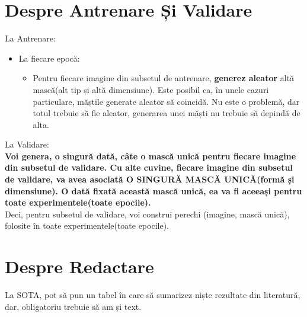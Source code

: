 \documentclass[12pt, a4paper]{article}
\begin{document}
\section{Despre Antrenare Și  Validare}
La Antrenare:
\begin{itemize}
    \item La fiecare epocă:
    \begin{itemize}
        \item Pentru fiecare imagine din subsetul de antrenare, \textbf{generez aleator} altă mască(alt tip și altă dimensiune). Este posibil ca, în unele cazuri particulare, măștile generate aleator să coincidă. Nu este o problemă, dar totul trebuie să fie aleator, generarea unei măști nu trebuie să depindă de alta.
    \end{itemize}
\end{itemize}
La Validare:\\
\textbf{\color{red} Voi genera, o singură dată, câte o mască unică pentru fiecare imagine din subsetul de validare. Cu alte cuvine, fiecare imagine din subsetul de validare, va avea asociată O SINGURĂ MASCĂ UNICĂ(formă și dimensiune). O dată fixată această mască unică, ea va fi aceeași pentru toate experimentele(toate epocile).}\\
Deci, pentru subsetul de validare, voi construi perechi (imagine, mască unică), folosite în toate experimentele(toate epocile).

\section{Despre Redactare}
La SOTA, pot să pun un tabel în care să sumarizez niște rezultate din literatură, dar, obligatoriu trebuie să am și text.
\end{document}
